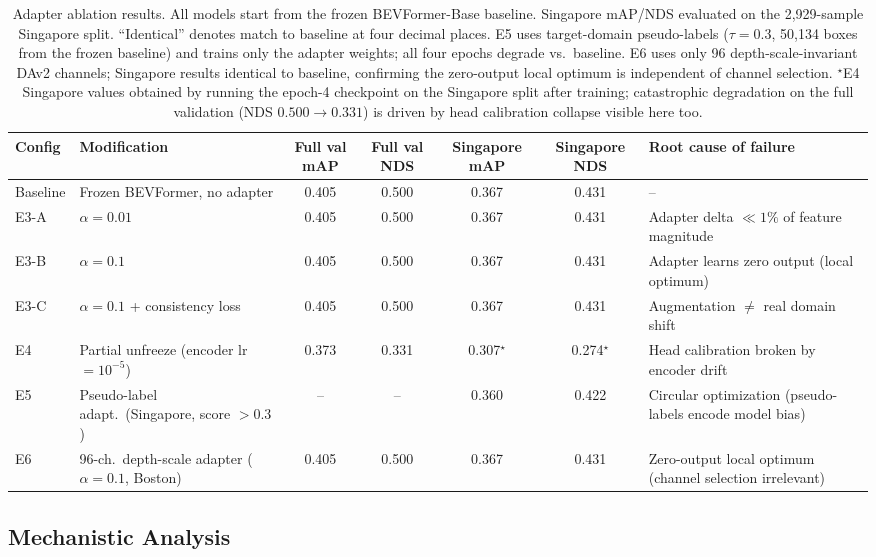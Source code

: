 \documentclass[letterpaper, 10pt, journal]{IEEEtran}
\begin{document}
\begin{table}[t]
\centering
\caption{Adapter ablation results. All models start from the frozen BEVFormer-Base
  baseline. Singapore mAP/NDS evaluated on the 2{,}929-sample Singapore split.
  ``Identical'' denotes match to baseline at four decimal places.
  E5 uses target-domain pseudo-labels ($\tau=0.3$, 50{,}134 boxes from the frozen baseline)
  and trains only the adapter weights; all four epochs degrade vs.\ baseline.
  E6 uses only 96 depth-scale-invariant DAv2 channels; Singapore results identical to
  baseline, confirming the zero-output local optimum is independent of channel selection.
  $^{\star}$E4 Singapore values obtained by running the epoch-4 checkpoint on the
  Singapore split after training; catastrophic degradation on the full validation
  (NDS $0.500 \to 0.331$) is driven by head calibration collapse visible here too.}
\label{tab:ablation}
\setlength{\tabcolsep}{6pt}
\begin{tabular}{@{}llccccl@{}}
\toprule
Config & Modification & Full val mAP & Full val NDS
       & Singapore mAP & Singapore NDS & Root cause of failure \\
\midrule
Baseline & Frozen BEVFormer, no adapter
  & 0.405 & 0.500 & 0.367 & 0.431 & -- \\
\midrule
E3-A & $\alpha = 0.01$
  & 0.405 & 0.500 & 0.367 & 0.431 & Adapter delta $\ll 1\%$ of feature magnitude \\
E3-B & $\alpha = 0.1$
  & 0.405 & 0.500 & 0.367 & 0.431 & Adapter learns zero output (local optimum) \\
E3-C & $\alpha = 0.1$ + consistency loss
  & 0.405 & 0.500 & 0.367 & 0.431 & Augmentation $\neq$ real domain shift \\
E4   & Partial unfreeze (encoder lr $= 10^{-5}$)
  & 0.373 & 0.331 & 0.307$^{\star}$ & 0.274$^{\star}$ & Head calibration broken by encoder drift \\
\midrule
E5   & Pseudo-label adapt.\ (Singapore, score $>0.3$)
  & -- & -- & 0.360 & 0.422 & Circular optimization (pseudo-labels encode model bias) \\
\midrule
E6   & 96-ch.\ depth-scale adapter ($\alpha = 0.1$, Boston)
  & 0.405 & 0.500 & 0.367 & 0.431 & Zero-output local optimum (channel selection irrelevant) \\
\bottomrule
\end{tabular}
\end{table}

\subsection{Mechanistic Analysis}
\end{document}
